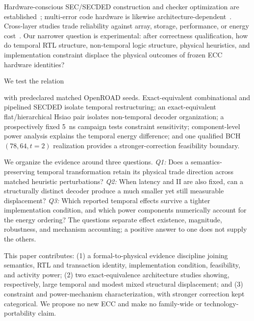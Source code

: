 \documentclass[conference,10pt]{IEEEtran}
\begin{document}
Hardware-conscious SEC/SECDED construction and checker optimization are established~\cite{hsiao1970,ghosh2004,reviriego2013,tripathi2020}; multi-error code hardware is likewise architecture-dependent~\cite{naseer2008,chen2004,wong2011,yoo2016,lagendijk2026}. Cross-layer studies trade reliability against array, storage, performance, or energy cost~\cite{delbel2014,pajouhi2015,nair2016,das2019,wei2020,lee2022,yoon2011}. Our narrower question is experimental: after correctness qualification, how do temporal RTL structure, non-temporal logic structure, physical heuristics, and implementation constraint displace the physical outcomes of frozen ECC hardware identities?

We test the relation
\begin{center}
\end{center}
with predeclared matched OpenROAD seeds. Exact-equivalent combinational and pipelined SECDED isolate temporal restructuring; an exact-equivalent flat/hierarchical Hsiao pair isolates non-temporal decoder organization; a prospectively fixed 5~ns campaign tests constraint sensitivity; component-level power analysis explains the temporal energy difference; and one qualified BCH $(78,64,t=2)$ realization provides a stronger-correction feasibility boundary.

We organize the evidence around three questions. \emph{Q1:} Does a semantics-preserving temporal transformation retain its physical trade direction across matched heuristic perturbations? \emph{Q2:} When latency and II are also fixed, can a structurally distinct decoder produce a much smaller yet still measurable displacement? \emph{Q3:} Which reported temporal effects survive a tighter implementation condition, and which power components numerically account for the energy ordering? The questions separate effect existence, magnitude, robustness, and mechanism accounting; a positive answer to one does not supply the others.

This paper contributes: (1) a formal-to-physical evidence discipline joining semantics, RTL and transaction identity, implementation condition, feasibility, and activity power; (2) two exact-equivalence architecture studies showing, respectively, large temporal and modest mixed structural displacement; and (3) constraint and power-mechanism characterization, with stronger correction kept categorical. We propose no new ECC and make no family-wide or technology-portability claim.
\end{document}
